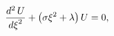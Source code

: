 \[\frac{{d}^{2}\mathop{U\/}\nolimits}{{d\xi}^{2}}+\left(\sigma\xi^{2}+\lambda%
\right)\mathop{U\/}\nolimits=0,\]
